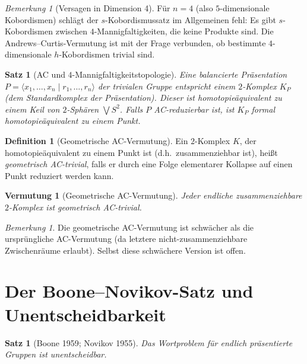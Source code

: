 \documentclass[12pt,a4paper]{amsart}
\newtheorem{satz}[theorem]{Satz}
\newtheorem{vermutung}[theorem]{Vermutung}
\theoremstyle{definition}
\newtheorem{definition_de}[theorem]{Definition}
\theoremstyle{remark}
\newtheorem{bemerkung}[theorem]{Bemerkung}
\begin{document}
\begin{bemerkung}[Versagen in Dimension 4]
Für $n = 4$ (also $5$-dimensionale Kobordismen) schlägt der $s$-Kobordismussatz im
Allgemeinen fehl: Es gibt $s$-Kobordismen zwischen $4$-Mannigfaltigkeiten, die keine
Produkte sind. Die Andrews--Curtis-Vermutung ist mit der Frage verbunden, ob bestimmte
$4$-dimensionale $h$-Kobordismen trivial sind.
\end{bemerkung}

\begin{satz}[AC und $4$-Mannigfaltigkeitstopologie]\label{satz:AC4mfgk}
Eine balancierte Präsentation $P = \langle x_1,\ldots,x_n \mid r_1,\ldots,r_n \rangle$
der trivialen Gruppe entspricht einem $2$-Komplex $K_P$ (dem Standardkomplex der
Präsentation). Dieser ist homotopieäquivalent zu einem Keil von $2$-Sphären
$\bigvee S^2$. Falls $P$ AC-reduzierbar ist, ist $K_P$ formal homotopieäquivalent
zu einem Punkt.
\end{satz}

\begin{definition_de}[Geometrische AC-Vermutung]
Ein $2$-Komplex $K$, der homotopieäquivalent zu einem Punkt ist (d.h.\ zusammenziehbar
ist), heißt \emph{geometrisch AC-trivial}, falls er durch eine Folge elementarer
Kollapse auf einen Punkt reduziert werden kann.
\end{definition_de}

\begin{vermutung}[Geometrische AC-Vermutung]\label{verm:geoAC}
Jeder endliche zusammenziehbare $2$-Komplex ist geometrisch AC-trivial.
\end{vermutung}

\begin{bemerkung}
Die geometrische AC-Vermutung ist schwächer als die ursprüngliche AC-Vermutung
(da letztere nicht-zusammenziehbare Zwischenräume erlaubt). Selbst diese schwächere
Version ist offen.
\end{bemerkung}

\section{Der Boone--Novikov-Satz und Unentscheidbarkeit}

\begin{satz}[Boone 1959; Novikov 1955]\label{satz:BN}
Das Wortproblem für endlich präsentierte Gruppen ist unentscheidbar.
\end{satz}
\end{document}
